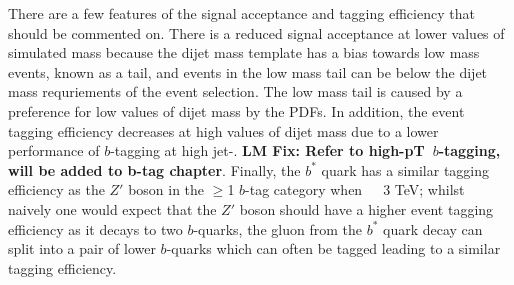There are a few features of the signal acceptance and tagging efficiency that should be commented on.
There is a reduced signal acceptance at lower values of simulated mass
because the dijet mass template has a bias towards low mass events, known as a tail,
and events in the low mass tail can be below the dijet mass requriements of the event selection.
The low mass tail is caused by a preference for low values of dijet mass by the PDFs.
In addition, the event tagging efficiency decreases at high values of dijet mass
due to a lower performance of $b$-tagging at high jet-\pT.
\textbf{LM Fix: Refer to high-pT~$b$-tagging, will be added to b-tag chapter}.
Finally, the $b^*$ quark has a similar tagging efficiency
as the $Z'$ boson in the $\geq$1 $b$-tag category when~\mjj~\gt~3 TeV;
whilst naively one would expect that the $Z'$ boson should have a higher
event tagging efficiency as it decays to two $b$-quarks,
the gluon from the $b^*$ quark decay can split into a pair of lower \pT{} $b$-quarks
which can often be tagged leading to a similar tagging efficiency.
